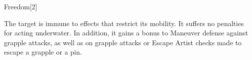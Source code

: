 \begin{spellsection}{Freedom}[2]
    \begin{spellheader}
    \end{spellheader}
    \begin{spellcontent}
        \begin{spelltargetinginfo}
        \end{spelltargetinginfo}
        \begin{spelleffects}
            \spelleffect The target is immune to effects that restrict its mobility. It suffers no penalties for acting underwater. In addition, it gains a  bonus to Maneuver defense against grapple attacks, as well as on grapple attacks or Escape Artist checks made to escape a grapple or a pin.
            \spelldur \durshort
        \end{spelleffects}
    \end{spellcontent}
    \begin{spellfooter}
        \miscastrandom
    \end{spellfooter}
    \begin{spellaugments}
    \end{spellaugments}
\end{spellsection}

